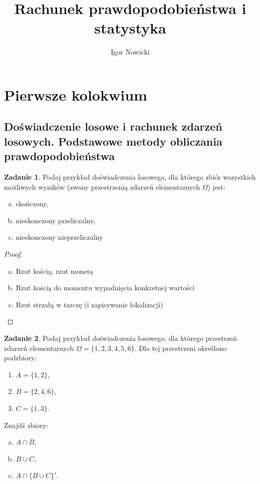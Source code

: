 \documentclass[11pt]{article}
\title{Rachunek prawdopodobieństwa i statystyka}
\author{Igor Nowicki}
\theoremstyle{definition}
\newtheorem{zadanie}{Zadanie}
\numberwithin{zadanie}{section}
\begin{document}
\maketitle
\tableofcontents
\section{Pierwsze kolokwium}
\subsection{Doświadczenie losowe i rachunek zdarzeń losowych. Podstawowe metody obliczania prawdopodobieństwa}

\begin{zadanie}
    Podaj przykład doświadczenia losowego, dla którego zbiór wszystkich możliwych wyników (zwany przestrzenią zdarzeń elementarnych $\Omega$) jest:
    \begin{enumerate}[a)]
        \item skończony,
        \item nieskonczony przeliczalny,
        \item nieskonczony nieprzeliczalny
    \end{enumerate}
\end{zadanie}

\begin{proof}
    \begin{enumerate}[a)]
        \item Rzut kością, rzut monetą
        \item Rzut kością do momentu wypadnięcia konkretnej wartości
        \item Rzut strzałą w tarczę (i zapisywanie lokalizacji)
    \end{enumerate}
\end{proof}

\begin{zadanie}
    Podaj przykład doświadczenia losowego, dla którego przestrzeń zdarzeń elementarnych $\Omega = \{1, 2, 3, 4, 5, 6\}$. Dla tej
    przestrzeni określono podzbiory:
    \begin{enumerate}
        \item $A = \{1, 2\},$
        \item $B = \{2, 4, 6\}$,
        \item $C = \{1, 3\}$.
    \end{enumerate}
    Znajdź zbiory:
    \begin{enumerate}[a)]
        \item $A \cap B,$
        \item $B \cup C,$
        \item $A \cap \{B \cup C\}'.$
    \end{enumerate}
\end{zadanie}
\end{document}
